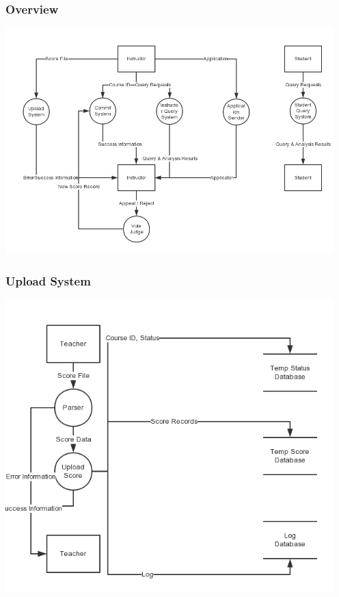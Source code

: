\documentclass[a4]{article}
\begin{document}
\subsubsection{Overview}
\includegraphics[width=5in]{pic/2-0.png}
\subsubsection{Upload System}
\includegraphics[width=5in]{pic/2-1.png}
\end{document}
